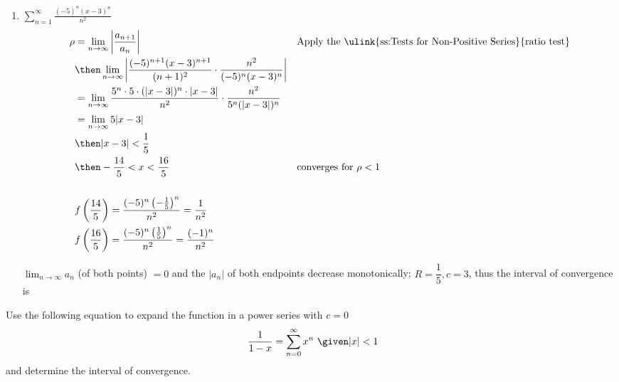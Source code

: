 \begin{enumerate}[itemsep=24em]
\newpage %

  \item \(\displaystyle \sum_{n=1}^{\infty} \frac{(-5)^n(x-3)^n}{n^2} \)
    \begin{align*}
      \rho &= \lim_{n \to \infty} \left| \frac{a_{n+1}}{a_n}  \right|
           && \text{Apply the \ulink{ss:Tests for Non-Positive Series}{ratio test}} \\
      &\then \lim_{n \to \infty} \left|
      \frac{(-5)^{n+1} (x-3)^{n+1}}{(n+1)^2} \cdot
      \frac{n^2}{(-5)^n(x-3)^n}
      \right| \\
      &= \lim_{n \to \infty}
      \frac{5^n\cdot 5 \cdot (|x-3|)^{n} \cdot |x-3|}{n^2} \cdot
      \frac{n^2}{5^n(|x-3|)^n} \\
      &=\lim_{n \to \infty} 5|x-3| \\
      &\then |x-3| < \frac{1}{5} \\
      &\then -\frac{14}{5} < x < \frac{16}{5}
      && \text{converges for}~\rho < 1 \\
      \\
      &f\left(\frac{14}{5}\right) = \frac{(-5)^n\left(-\frac{1}{5}\right)^n}{n^2} = \frac{1}{n^2}
      \\
      &f\left(\frac{16}{5}\right) = \frac{(-5)^n\left(\frac{1}{5}\right)^n}{n^2} = \frac{(-1)^n}{n^2}
    \end{align*}

    \(\lim_{n \to \infty}  a_n\) (of both points) \(= 0\) and the \(|a_n|\) of both
    endpoints decrease monotonically; \(R = \dfrac{1}{5}, c = 3\), thus the
    interval of convergence is 

\end{enumerate}

\newpage %

Use the following equation to expand the function in a power series with \(c =
0\) \[~\displaystyle \frac{1}{1-x} = \sum_{n=0}^{\infty} x^n ~\given |x| < 1 \]
and determine the interval of convergence.


